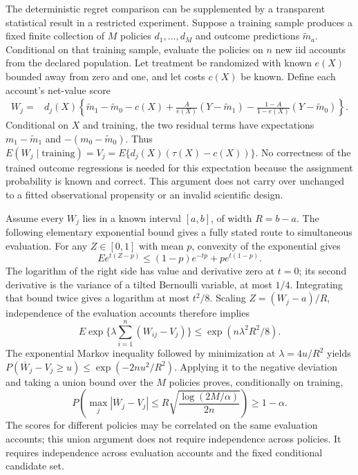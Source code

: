 The deterministic regret comparison can be supplemented by a transparent
statistical result in a restricted experiment. Suppose a training sample
produces a fixed finite collection of $M$ policies $d_1,\ldots,d_M$ and
outcome predictions $\widetilde m_a$. Conditional on that training sample,
evaluate the policies on $n$ new iid accounts from the declared population.
Let treatment be randomized with known $e(X)$ bounded away from zero and
one, and let costs $c(X)$ be known. Define each account's net-value score
\begin{align}
 W_j={}&d_j(X)\left\{\widetilde m_1-\widetilde m_0-c(X)
       +\frac{A}{e(X)}(Y-\widetilde m_1)
       -\frac{1-A}{1-e(X)}(Y-\widetilde m_0)\right\}.
 \label{exec17:s4-policy-score}
\end{align}
Conditional on $X$ and training, the two residual terms have expectations
$m_1-\widetilde m_1$ and $-(m_0-\widetilde m_0)$. Thus
$E(W_j\mid\text{training})=V_j=E\{d_j(X)(\tau(X)-c(X))\}$.
No correctness of the trained outcome regressions is needed for this
expectation because the assignment probability is known and correct.
This argument does not carry over unchanged to a fitted observational
propensity or an invalid scientific design.

Assume every $W_j$ lies in a known interval $[a,b]$, of width $R=b-a$.
The following elementary exponential bound gives a fully stated route to
simultaneous evaluation. For any $Z\in[0,1]$ with mean $p$, convexity of
the exponential gives
\[
 E e^{t(Z-p)}\leq (1-p)e^{-tp}+p e^{t(1-p)}.
\]
The logarithm of the right side has value and derivative zero at $t=0$;
its second derivative is the variance of a tilted Bernoulli variable,
at most $1/4$. Integrating that bound twice gives a logarithm at most
$t^2/8$. Scaling $Z=(W_j-a)/R$, independence of the evaluation accounts
therefore implies
\[
 E\exp\{\lambda\textstyle\sum_{i=1}^n(W_{ij}-V_j)\}
       \leq\exp(n\lambda^2R^2/8).
\]
The exponential Markov inequality followed by minimization at
$\lambda=4u/R^2$ yields
$P(\overline W_j-V_j\geq u)\leq\exp(-2nu^2/R^2)$.
Applying it to the negative deviation and taking a union bound over the
$M$ policies proves, conditionally on training,
\begin{equation}
 P\left(\max_j|\overline W_j-V_j|\leq
       R\sqrt{\frac{\log(2M/\alpha)}{2n}}\right)\geq1-\alpha.
 \label{exec17:s4-uniform-bound}
\end{equation}
The scores for different policies may be correlated on the same evaluation
accounts; this union argument does not require independence across policies.
It requires independence across evaluation accounts and the fixed conditional
candidate set.~\citep{exec17_s4_extension}

